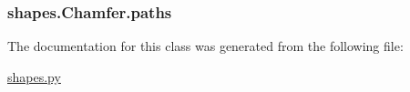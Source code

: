 \subsubsection[{paths}]{\setlength{\rightskip}{0pt plus 5cm}shapes.\+Chamfer.\+paths}\label{classshapes_1_1_chamfer_a77feca7b13c20722c7fecedc6a5536aa}


The documentation for this class was generated from the following file\+:\begin{DoxyCompactItemize}
\item 
\hyperlink{shapes_8py}{shapes.\+py}\end{DoxyCompactItemize}
